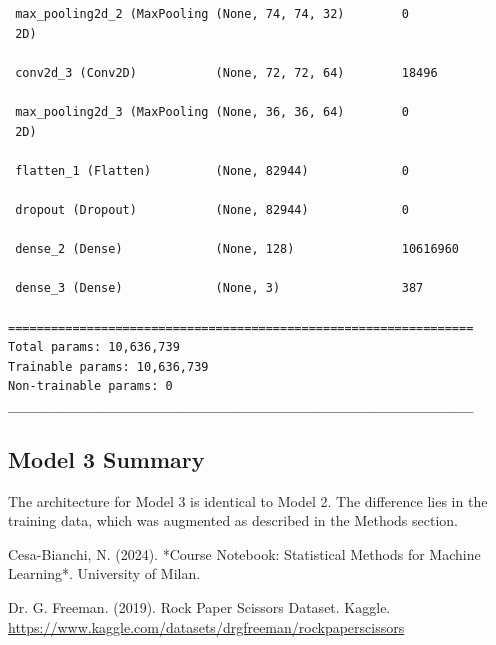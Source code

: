\documentclass[pdflatex,sn-mathphys-num]{sn-jnl}%
\theoremstyle{thmstyleone}%
\theoremstyle{thmstyletwo}%
\theoremstyle{thmstylethree}%
\begin{document}
\begin{appendices}
\begin{verbatim}
 max_pooling2d_2 (MaxPooling (None, 74, 74, 32)        0         
 2D)                                                             
                                                                 
 conv2d_3 (Conv2D)           (None, 72, 72, 64)        18496     
                                                                 
 max_pooling2d_3 (MaxPooling (None, 36, 36, 64)        0         
 2D)                                                             
                                                                 
 flatten_1 (Flatten)         (None, 82944)             0         
                                                                 
 dropout (Dropout)           (None, 82944)             0         
                                                                 
 dense_2 (Dense)             (None, 128)               10616960  
                                                                 
 dense_3 (Dense)             (None, 3)                 387       
                                                                 
=================================================================
Total params: 10,636,739
Trainable params: 10,636,739
Non-trainable params: 0
_________________________________________________________________
\end{verbatim}

\subsection{Model 3 Summary}
The architecture for Model 3 is identical to Model 2. The difference lies in the training data, which was augmented as described in the Methods section.

\end{appendices}


\begin{thebibliography}{9}

Cesa-Bianchi, N. (2024). *Course Notebook: Statistical Methods for Machine Learning*. University of Milan.

Dr. G. Freeman. (2019). Rock Paper Scissors Dataset. Kaggle. \url{https://www.kaggle.com/datasets/drgfreeman/rockpaperscissors}

\end{thebibliography}
\end{document}
